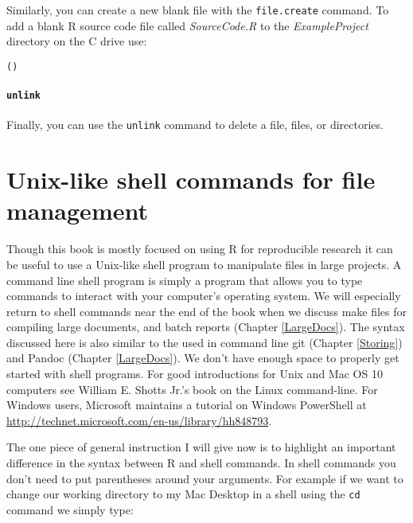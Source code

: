 {Similarly, you can create a new blank file with the \texttt{file.create} command. To add a blank R source code file called {\emph{SourceCode.R}} to the {\emph{ExampleProject}} directory on the C drive use:

\begin{knitrout}
\color{fgcolor}\begin{kframe}
\begin{alltt}
()
\end{alltt}
\end{kframe}
\end{knitrout}


\paragraph{{\tt{unlink}}}

Finally, you can use the {\tt{unlink}} command to delete a file, files, or directories. 

\section{Unix-like shell commands for file management} 

Though this book is mostly focused on using R for reproducible research it can be useful to use a Unix-like shell program to manipulate files in large projects. A command line shell program is simply a program that allows you to type commands to interact with your computer's operating system. We will especially return to shell commands near the end of the book when we discuss make files for compiling large documents, and batch reports (Chapter \ref{LargeDocs}). The syntax discussed here is also similar to the used in command line git (Chapter \ref{Storing}) and Pandoc (Chapter \ref{LargeDocs}). We don't have enough space to properly get started with shell programs. For good introductions for Unix and Mac OS 10 computers see William E. Shotts Jr.'s book on the Linux command-line\cite[]{ShottsJr2012}. For Windows users, Microsoft maintains a tutorial on Windows PowerShell at \url{http://technet.microsoft.com/en-us/library/hh848793}.

The one piece of general instruction I will give now is to highlight an important difference in the syntax between R and shell commands. In shell commands you don't need to put parentheses around your arguments. For example if we want to change our working directory to my Mac Desktop in a shell using the {\tt{cd}} command we simply type:

}
